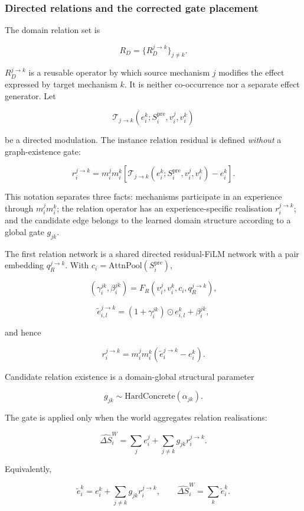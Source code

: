 \documentclass[11pt]{article}
\begin{document}
\subsubsection*{Directed relations and the corrected gate placement}

The domain relation set is

\[
\boxed{R_D=\{R_D^{j\rightarrow k}\}_{j\neq k}.}
\]

$R_D^{j\rightarrow k}$ is a reusable operator by which source mechanism $j$ modifies the effect expressed by target mechanism $k$.
It is neither co-occurrence nor a separate effect generator. Let

\[
\mathcal T_{j\rightarrow k}
(e_i^k;S_i^{\mathrm{pre}},v_i^j,v_i^k)
\]

be a directed modulation. The instance relation residual is defined \emph{without} a graph-existence gate:

\[
\boxed{
r_i^{j\rightarrow k}=
m_i^jm_i^k
\left[
\mathcal T_{j\rightarrow k}
(e_i^k;S_i^{\mathrm{pre}},v_i^j,v_i^k)-e_i^k
\right].}
\]

This notation separates three facts: mechanisms participate in an experience through $m_i^jm_i^k$; the relation operator has an
experience-specific realisation $r_i^{j\rightarrow k}$; and the candidate edge belongs to the learned domain structure according to a
global gate $g_{jk}$.

The first relation network is a shared directed residual-FiLM network with a pair embedding $q_R^{j\rightarrow k}$. With
$c_i=\mathrm{AttnPool}(S_i^{\mathrm{pre}})$,

\[
(\gamma_i^{jk},\beta_i^{jk})=
F_R(v_i^j,v_i^k,c_i,q_R^{j\rightarrow k}),
\]

\[
\widetilde e_{i,l}^{j\rightarrow k}
=(1+\gamma_i^{jk})\odot e_{i,l}^k+\beta_i^{jk},
\]

and hence

\[
r_i^{j\rightarrow k}=m_i^jm_i^k
(\widetilde e_i^{j\rightarrow k}-e_i^k).
\]

Candidate relation existence is a domain-global structural parameter

\[
\boxed{g_{jk}\sim\mathrm{HardConcrete}(\alpha_{jk}).}
\]

The gate is applied only when the world aggregates relation realisations:

\[
\boxed{
\widehat{\Delta S}_i^W=
\sum_j e_i^j+
\sum_{j\neq k}g_{jk}r_i^{j\rightarrow k}.}
\]

Equivalently,

\[
\widetilde e_i^k=e_i^k+\sum_{j\neq k}g_{jk}r_i^{j\rightarrow k},
\qquad
\widehat{\Delta S}_i^W=\sum_k\widetilde e_i^k.
\]
\end{document}
